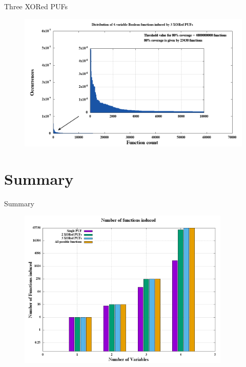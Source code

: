 \documentclass[10pt, compress]{beamer}
\begin{document}
\begin{frame}{Three XORed PUFs}
    \begin{figure}
        \centering
        \includegraphics[width=\textwidth]{figures/zoom/distribution_of_4-variable_boolean_functions_induced_by_3_xored_pufs_zoom.png}
    \end{figure}
\end{frame}

\section{Summary}

\begin{frame}{Summary}
    \begin{figure}
        \centering
        \includegraphics[width=0.9\textwidth]{figures/hist.png}
    \end{figure}
\end{frame}
\end{document}
